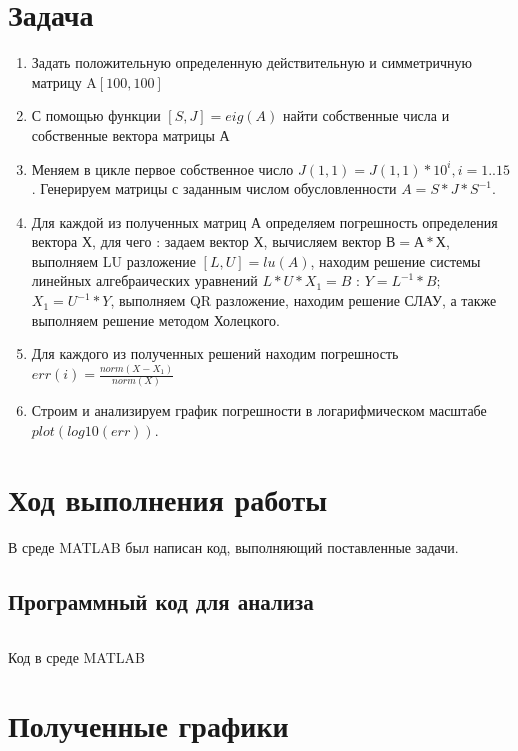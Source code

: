 \section{Задача}

\begin{enumerate}
	\item Задать положительную определенную действительную и симметричную матрицу A\([100,100]\)
	\item С помощью функции \([S,J]=eig(A)\) найти собственные числа и собственные вектора матрицы А
	\item Меняем в цикле первое собственное число \(J(1,1)=J(1,1)*10^i, i = 1..15\). Генерируем матрицы с заданным числом обусловленности \(A=S*J*S^{-1}\).
	\item Для каждой из полученных матриц А определяем погрешность определения вектора Х, для чего : задаем вектор Х, вычисляем вектор \(В=А*Х\), выполняем LU разложение \([L,U]=lu(A)\), находим решение системы линейных алгебраических уравнений \(L*U*X_1=B\) : \(Y=L^{-1}*B\); \(X_1=U^{-1}*Y\), выполняем QR разложение, находим решение СЛАУ, а также выполняем решение методом Холецкого.
	\item Для каждого из полученных решений находим погрешность \(err(i)=\frac{norm(X-X_1)}{norm(X)}\)
	\item Строим и анализируем график погрешности в логарифмическом масштабе \(plot(log10(err))\).
\end{enumerate}

\newpage

\section{Ход выполнения работы}

В среде MATLAB был написан код, выполняющий поставленные задачи.

\subsection{Программный код для анализа}
\begin{code}
	\inputminted[breaklines=true, xleftmargin=1em, linenos, frame=single, framesep=10pt, fontsize=\footnotesize, firstline=1, lastline=33]{matlab}{listings/luqr.m}
	\caption{Код в среде MATLAB}
\end{code}

\section{Полученные графики}

